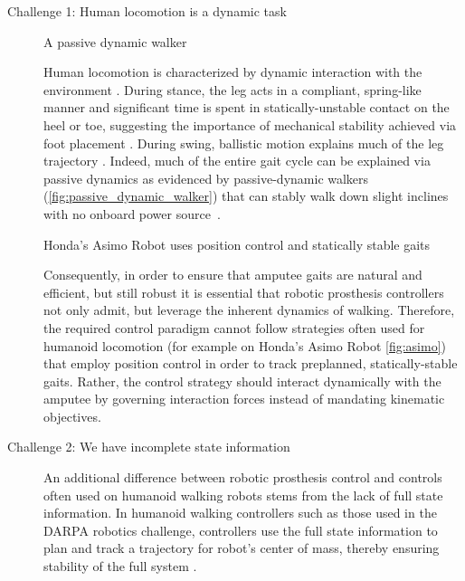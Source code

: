 \begin{description}
    \item[Challenge 1: Human locomotion is a dynamic task] 
    \begin{marginfigure}[-0.5in]
        \centering
        \caption{A passive dynamic walker}
        \label{fig:passive_dynamic_walker}
    \end{marginfigure}
    
    Human locomotion is characterized by dynamic interaction with the
    environment \citep{mcgeer_1992}. During stance, the leg acts in a compliant,
    spring-like manner \citep{geyer2006compliant} and significant time is spent
    in statically-unstable contact on the heel or toe, suggesting the importance
    of mechanical stability achieved via foot placement \citep{perry1992gait}.
    During swing, ballistic motion explains much of the leg trajectory
    \citep{mochon1980ballistic}. Indeed, much of the entire gait cycle can be
    explained via passive dynamics as evidenced by passive-dynamic walkers
    (\cref{fig:passive_dynamic_walker}) that can stably walk down slight
    inclines with no onboard power source~\citep{mcgeer1990passive,
    collins2005efficient}.

    \begin{marginfigure}[-0.5in]
        \centering
        \caption{Honda's Asimo Robot uses position control and statically
        stable gaits}
        \label{fig:asimo}
    \end{marginfigure}

    Consequently, in order to ensure that amputee gaits are natural and
    efficient, but still robust it is essential that robotic prosthesis
    controllers not only admit, but leverage the inherent dynamics of walking.
    Therefore, the required control paradigm cannot follow strategies often used
    for humanoid locomotion (for example on Honda's Asimo Robot
    \cref{fig:asimo}) that employ position control in order to track preplanned,
    statically-stable gaits. Rather, the control strategy should interact
    dynamically with the amputee by governing interaction forces instead of
    mandating kinematic objectives.

    \item[Challenge 2: We have incomplete state information]

    An additional difference between robotic prosthesis control and controls
    often used on humanoid walking robots stems from the lack of full state
    information. In humanoid walking controllers such as those used in the DARPA
    robotics challenge, controllers use the full state information to
    plan and track a trajectory for robot's center of mass, thereby
    ensuring stability of the full system \citep{feng2015optimization,
    kuindersma2014efficiently, englsberger2014trajectory}.
    

\end{description}
